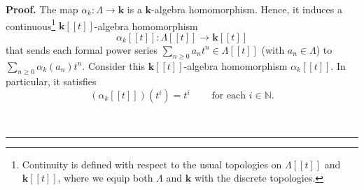 \documentclass[numbers=enddot,12pt,final,onecolumn,notitlepage]{scrartcl}%
\theoremstyle{definition}
\newenvironment{proof}[1][Proof]{\noindent\textbf{#1.} }{\ \rule{0.5em}{0.5em}}
\let\sumnonlimits\sum
\renewcommand{\sum}{\sumnonlimits\limits}
\newenvironment{verlong}{}{}
\begin{document}
\begin{proof}
\begin{verlong}
The map $\alpha_{k}:\Lambda\rightarrow\mathbf{k}$ is a $\mathbf{k}$-algebra
homomorphism. Hence, it induces a continuous\footnote{Continuity is defined
with respect to the usual topologies on $\Lambda\left[  \left[  t\right]
\right]  $ and $\mathbf{k}\left[  \left[  t\right]  \right]  $, where we equip
both $\Lambda$ and $\mathbf{k}$ with the discrete topologies.} $\mathbf{k}%
\left[  \left[  t\right]  \right]  $-algebra homomorphism%
\[
\alpha_{k}\left[  \left[  t\right]  \right]  :\Lambda\left[  \left[  t\right]
\right]  \rightarrow\mathbf{k}\left[  \left[  t\right]  \right]
\]
that sends each formal power series $\sum_{n\geq0}a_{n}t^{n}\in\Lambda\left[
\left[  t\right]  \right]  $ (with $a_{n}\in\Lambda$) to $\sum_{n\geq0}%
\alpha_{k}\left(  a_{n}\right)  t^{n}$. Consider this $\mathbf{k}\left[
\left[  t\right]  \right]  $-algebra homomorphism $\alpha_{k}\left[  \left[
t\right]  \right]  $. In particular, it satisfies
\[
\left(  \alpha_{k}\left[  \left[  t\right]  \right]  \right)  \left(
t^{i}\right)  =t^{i}\ \ \ \ \ \ \ \ \ \ \text{for each }i\in\mathbb{N}.
\]

\end{verlong}


\end{proof}
\end{document}
